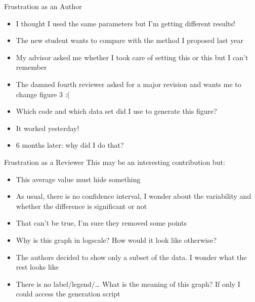 \documentclass[xcolor=x11names,compress,8pt]{beamer}
\renewcommand{\(}{\begin{columns}}
\renewcommand{\)}{\end{columns}}
\newcommand{\<}[1]{\begin{column}{#1}}
\renewcommand{\>}{\end{column}}
\begin{document}
\label{sec-1}
\begin{frame}[label=sec-1-0-1]{Frustration as an Author }
\begin{itemize}
\item I thought I used the same parameters but \alert{I'm getting different
results!}
\item The new student wants to compare with \alert{the method I proposed last
year}
\item My advisor asked me whether I took care of setting this or this but
I can't remember
\item The damned fourth reviewer asked for a major revision and wants me
to \alert{change figure 3} :(
\item \alert{Which code} and \alert{which data set} did I use to generate this figure?
\item It \alert{worked yesterday}!
\item 6 months later: \alert{why} did I do that?
\end{itemize}
\end{frame}
\begin{frame}[label=sec-1-0-2]{Frustration as a Reviewer }
This may be an interesting contribution but:
\begin{itemize}
\item This \alert{average value} must hide something
\item As usual, there is no \alert{confidence interval}, I wonder about the
variability and whether the difference is \alert{significant} or not
\item That can't be true, I'm sure they \alert{removed some points}
\item Why is this graph in \alert{logscale}? How would it look like otherwise?
\item The authors decided to show only a \alert{subset of the data}. I wonder
what the rest looks like
\item There is no label/legend/\ldots{} What is the \alert{meaning of this graph}?
If only I could access the generation script
\end{itemize}
\end{frame}
\end{document}
